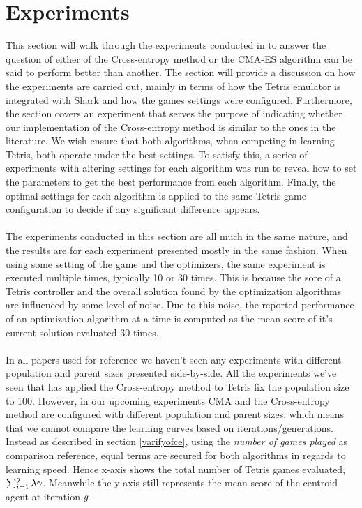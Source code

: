 \section{Experiments}


This section will walk through the experiments conducted in to answer the question 
of either of the Cross-entropy method or the CMA-ES algorithm can be said to perform better
than another. The section will provide a discussion on how the experiments are carried out, mainly
in terms of how the Tetris emulator is integrated with Shark and how the games settings were configured.
Furthermore, the section covers an experiment that serves the purpose of indicating whether our implementation 
of the Cross-entropy method is similar to the ones in the literature. 
We wish ensure that both algorithms, when competing in learning Tetris, both operate under the 
best settings. To satisfy this, a series of experiments with altering settings for each 
algorithm was run to reveal how to set the parameters to get the best performance from 
each algorithm. Finally, the optimal settings for each algorithm is applied to
the same Tetris game configuration to decide if any significant difference appears.\\
\\
The experiments conducted in this section are all much in the same nature, and the 
results are for each experiment presented mostly in the same fashion. When using some setting 
of the game and the optimizers, the same experiment is executed multiple times, typically 
10 or 30 times. This is because the sore of a Tetris controller and the overall 
solution found by the optimization algorithms are influenced by some level of noise.
Due to this noise, the reported performance of an optimization algorithm at a time
is computed as the mean score of it's current solution evaluated 30 times.\\
\\
In all papers used for reference we haven't seen any experiments with different population
and parent sizes presented side-by-side. All the experiments we've seen
that has applied the Cross-entropy method to Tetris fix the population size to 100. 
However, in our upcoming experiments
CMA and the Cross-entropy method are configured with different population and parent sizes, which means
that we cannot compare the learning curves based on iterations/generations. Instead as described
in section \ref{varifyofce}, using the  
\textit{number of games played} as comparison reference, equal terms are secured for both algorithms 
in regards to learning speed.
Hence x-axis shows the total number 
of Tetris games evaluated, 
$\sum_{i = 1}^{g} \lambda \gamma$. 
Meanwhile the y-axis still represents the mean score 
of the centroid agent at iteration $g$.














